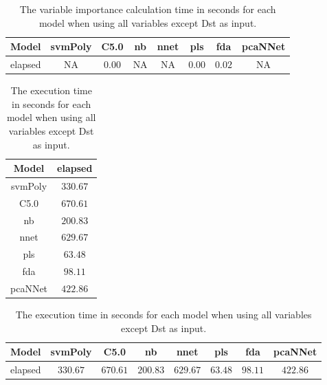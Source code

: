 \begin{table}[!ht]
	\centering
	\begin{tabular}{|c|c|c|c|c|c|c|c|}
		\hline
		Model & svmPoly & C5.0 & nb & nnet & pls & fda & pcaNNet \\ \hline
		elapsed & NA & $0.00$ & NA & NA & $0.00$ & $0.02$ & NA \\ \hline
	\end{tabular}
	\caption{The variable importance calculation time in seconds for each model when using all variables except Dst as input.}
	\label{tab:time:reverse:noDst:importance}
\end{table}

\begin{table}[!ht]
	\centering
	\begin{tabular}{|c|c|}
		\hline
		Model & elapsed \\ \hline
		svmPoly & $330.67$ \\ \hline
		C5.0 & $670.61$ \\ \hline
		nb & $200.83$ \\ \hline
		nnet & $629.67$ \\ \hline
		pls & $63.48$ \\ \hline
		fda & $98.11$ \\ \hline
		pcaNNet & $422.86$ \\ \hline
	\end{tabular}
	\caption{The execution time in seconds for each model when using all variables except Dst as input.}
	\label{tab:time:noDst:total}
\end{table}

\begin{table}[!ht]
	\centering
	\begin{tabular}{|c|c|c|c|c|c|c|c|}
		\hline
		Model & svmPoly & C5.0 & nb & nnet & pls & fda & pcaNNet \\ \hline
		elapsed & $330.67$ & $670.61$ & $200.83$ & $629.67$ & $63.48$ & $98.11$ & $422.86$ \\ \hline
	\end{tabular}
	\caption{The execution time in seconds for each model when using all variables except Dst as input.}
	\label{tab:time:reverse:noDst:total}
\end{table}

